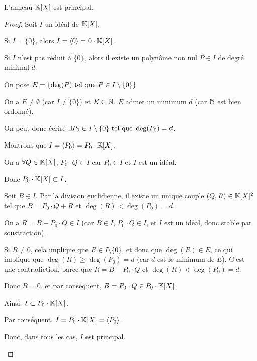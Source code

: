 \documentclass[12pt,a4paper]{report}
\begin{document}
\begin{property}
    L'anneau $\mathbb{K}[X]$ est principal.
\end{property}

\begin{proof}
    Soit $I$ un idéal de $\mathbb{K}[X]$.

    \begin{outline}
        \1 Si $I = \{0\}$, alors $I = \langle 0 \rangle = 0\cdot\mathbb{K}[X]$.

        \1 Si $I$ n'est pas réduit à $\{0\}$, alors il existe un polynôme non nul $P \in I$ de degré minimal $d$.

        \2 On pose $E = \{\deg(P) \text{ tel que } P \in I\setminus\{0\}\}$

        \2 On a $E \ne \emptyset$ (car $I \ne \{0\}$) et $E \subset \mathbb{N}$. $E$ admet un minimum $d$ (car $\mathbb{N}$ est bien ordonné).

        \2 On peut donc écrire $\exists P_0 \in I \setminus \{0\} \text{ tel que } \deg(P_0) = d$.

        \2 Montrons que $I = \langle P_0 \rangle = P_0 \cdot \mathbb{K}[X]$.

        \2 On a $\forall Q \in \mathbb{K}[X]$, $P_0 \cdot Q \in I$ car $P_0 \in I$ et $I$ est un idéal.

        \2 Donc $P_0 \cdot \mathbb{K}[X] \subset I$.

        \2 Soit $B \in I$. Par la division euclidienne, il existe un unique couple $(Q,R) \in \mathbb{K}[X]^2$ tel que $B = P_0 \cdot Q + R$ et $\deg(R) < \deg(P_0) = d$.

        \2 On a $R = B - P_0 \cdot Q \in I$ (car $B \in I$, $P_0 \cdot Q \in I$, et $I$ est un idéal, donc stable par soustraction).

        \3 Si $R \ne 0$, cela implique que $R \in I\setminus\{0\}$, et donc que $\deg(R) \in E$, ce qui implique que $\deg(R) \ge \deg(P_0) = d$ (car $d$ est le minimum de $E$). C'est une contradiction, parce que $R = B- P_0 \cdot Q$ et $\deg(R) < \deg(P_0) = d$.

        \3 Donc $R = 0$, et par conséquent, $B = P_0 \cdot Q \in P_0 \cdot \mathbb{K}[X]$.

        \2 Ainsi, $I \subset P_0 \cdot \mathbb{K}[X]$.

        \2 Par conséquent, $I = P_0 \cdot \mathbb{K}[X] = \langle P_0 \rangle$.

        \1 Donc, dans tous les cas, $I$ est principal.
    \end{outline}
\end{proof}
\end{document}
